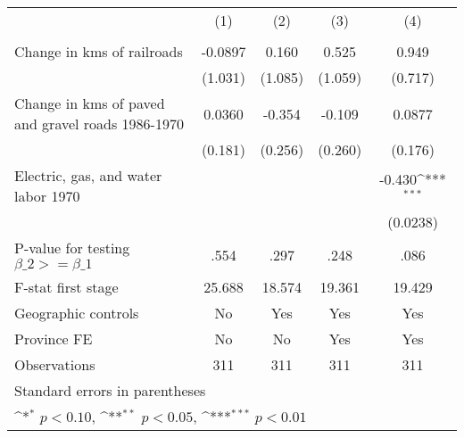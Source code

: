 {
\def\sym#1{\ifmmode^{#1}\else\(^{#1}\)\fi}
\begin{tabular}{l*{4}{c}}
\hline\hline
                &\multicolumn{1}{c}{(1)}&\multicolumn{1}{c}{(2)}&\multicolumn{1}{c}{(3)}&\multicolumn{1}{c}{(4)}\\
                &\multicolumn{1}{c}{}&\multicolumn{1}{c}{}&\multicolumn{1}{c}{}&\multicolumn{1}{c}{}\\
\hline
Change in kms of railroads&  -0.0897         &    0.160         &    0.525         &    0.949         \\
                &  (1.031)         &  (1.085)         &  (1.059)         &  (0.717)         \\
[1em]
Change in kms of paved and gravel roads 1986-1970&   0.0360         &   -0.354         &   -0.109         &   0.0877         \\
                &  (0.181)         &  (0.256)         &  (0.260)         &  (0.176)         \\
[1em]
Electric, gas, and water labor 1970&                  &                  &                  &   -0.430\sym{***}\\
                &                  &                  &                  & (0.0238)         \\
\hline
P-value for testing $\beta\_{2} >= \beta\_{1}$&     .554         &     .297         &     .248         &     .086         \\
F-stat first stage&   25.688         &   18.574         &   19.361         &   19.429         \\
Geographic controls&       No         &      Yes         &      Yes         &      Yes         \\
Province FE     &       No         &       No         &      Yes         &      Yes         \\
Observations    &      311         &      311         &      311         &      311         \\
\hline\hline
\multicolumn{5}{l}{\footnotesize Standard errors in parentheses}\\
\multicolumn{5}{l}{\footnotesize \sym{*} \(p<0.10\), \sym{**} \(p<0.05\), \sym{***} \(p<0.01\)}\\
\end{tabular}
}
